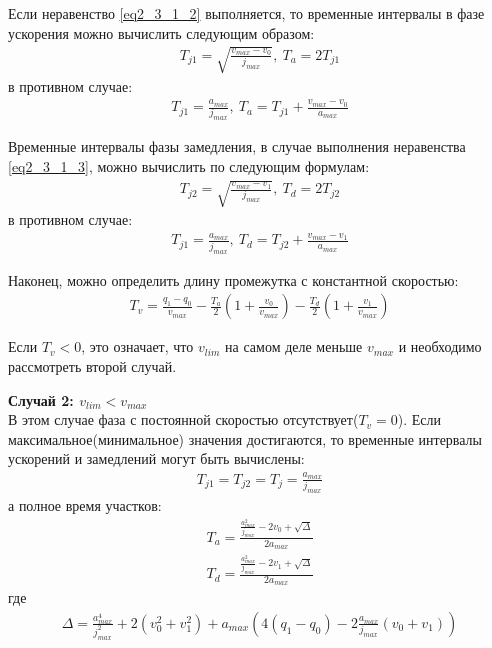 	Если неравенство \ref{eq2_3_1_2} выполняется, то временные интервалы в фазе ускорения можно вычислить следующим образом:
	\begin{align}
		T_{j1} = \sqrt{\frac{v_{max} - v_{0}}{j_{max}}},\ T_{a} = 2T_{j1}
	\end{align}
	в противном случае:
	\begin{align}
		T_{j1} = \frac{a_{max}}{j_{max}},\ T_{a} = T_{j1} + \frac{v_{max} - v_{0}}{a_{max}}
	\end{align}

	Временные интервалы фазы замедления, в случае выполнения неравенства \ref{eq2_3_1_3}, можно вычислить по следующим формулам:
	\begin{align}
		T_{j2} = \sqrt{\frac{v_{max} - v_{1}}{j_{max}}},\ T_{d} = 2T_{j2}
	\end{align}
	в противном случае:
	\begin{align}
		T_{j1} = \frac{a_{max}}{j_{max}},\ T_{d} = T_{j2} + \frac{v_{max} - v_{1}}{a_{max}}
	\end{align}

	Наконец, можно определить длину промежутка с константной скоростью:
	\begin{align}
		T_{v} = \frac{q_{1} - q_{0}}{v_{max}} - \frac{T_{a}}{2}(1 + \frac{v_{0}}{v_{max}}) - \frac{T_{d}}{2}(1 + \frac{v_{1}}{v_{max}})
	\end{align}

	Если $T_{v} < 0$, это означает, что $v_{lim}$ на самом деле меньше $v_{max}$ и необходимо рассмотреть второй случай.
	
	\textbf{Случай 2: $v_{lim} < v_{max}$}\\
	В этом случае фаза с постоянной скоростью отсутствует($T_{v} = 0$). Если максимальное(минимальное) значения достигаются, то временные интервалы ускорений и замедлений могут быть вычислены:
	\begin{align} \label{eq2_3_1_4}
	T_{j1} = T_{j2} = T_{j} = \frac{a_{max}}{j_{max}}
	\end{align}
	а полное время участков:
	\begin{align} \label{eq2_3_1_5}
		T_{a} = \frac{\frac{a^{2}_{max}}{j_{max}} - 2v_{0} +\sqrt{\Delta}}{2a_{max}}
	\end{align}
	\begin{align} \label{eq2_3_1_6}
		T_{d} = \frac{\frac{a^{2}_{max}}{j_{max}} - 2v_{1} +\sqrt{\Delta}}{2a_{max}}
	\end{align}
	где
	\begin{align} \label{eq2_3_1_7}
		\Delta = \frac{a^{4}_{max}}{j_{max}^{2}} + 2(v_{0}^{2} + v_{1}^{2}) + a_{max}\left( 4(q_{1} - q_{0}) - 2\frac{a_{max}}{j_{max}}(v_{0}+v_{1}) \right)
	\end{align}

